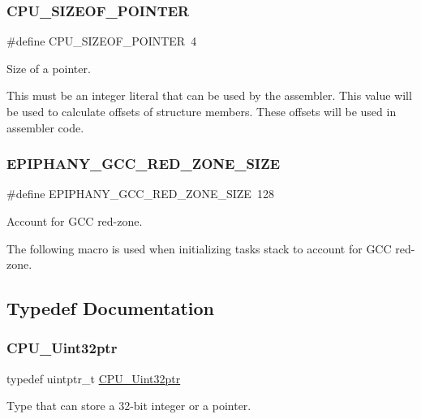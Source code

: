 \subsubsection{\texorpdfstring{CPU\_SIZEOF\_POINTER}{CPU\_SIZEOF\_POINTER}}
{\footnotesize\ttfamily \#define C\+P\+U\+\_\+\+S\+I\+Z\+E\+O\+F\+\_\+\+P\+O\+I\+N\+T\+ER~4}

Size of a pointer.

This must be an integer literal that can be used by the assembler. This value will be used to calculate offsets of structure members. These offsets will be used in assembler code. \mbox{\label{group__RTEMSScoreCPUEpiphany_gab05e3ce1be5f55e589601371695e6979}} 
\subsubsection{\texorpdfstring{EPIPHANY\_GCC\_RED\_ZONE\_SIZE}{EPIPHANY\_GCC\_RED\_ZONE\_SIZE}}
{\footnotesize\ttfamily \#define E\+P\+I\+P\+H\+A\+N\+Y\+\_\+\+G\+C\+C\+\_\+\+R\+E\+D\+\_\+\+Z\+O\+N\+E\+\_\+\+S\+I\+ZE~128}



Account for G\+CC red-\/zone. 

The following macro is used when initializing task\textquotesingle{}s stack to account for G\+CC red-\/zone. 

\subsection{Typedef Documentation}
\mbox{\label{group__RTEMSScoreCPUEpiphany_ga9fca17f81f850e128fcc8ed5b87ff2ab}} 
\subsubsection{\texorpdfstring{CPU\_Uint32ptr}{CPU\_Uint32ptr}}
{\footnotesize\ttfamily typedef uintptr\+\_\+t \mbox{\hyperlink{group__RTEMSScoreCPUARM_ga9fca17f81f850e128fcc8ed5b87ff2ab}{C\+P\+U\+\_\+\+Uint32ptr}}}

Type that can store a 32-\/bit integer or a pointer. 

